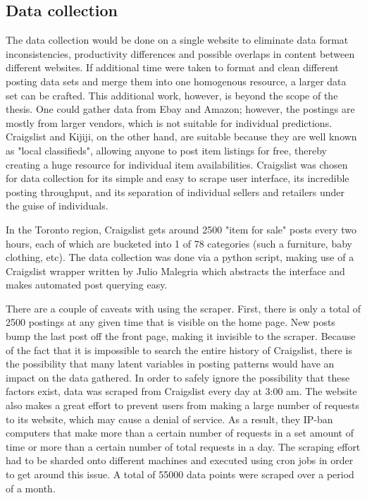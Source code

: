 \documentclass[12pt]{article}
\begin{document}
\subsection{Data collection}
The data collection would be done on a single website to eliminate data format inconsistencies, productivity differences and possible overlaps in content between different websites. If additional time were taken to format and clean different posting data sets and merge them into one homogenous resource, a larger data set can be crafted. This additional work, however, is beyond the scope of the thesis. One could gather data from Ebay and Amazon; however, the postings are mostly from larger vendors, which is not suitable for individual predictions. Craigslist and Kijiji, on the other hand, are suitable because they are well known as "local classifieds", allowing anyone to post item listings for free, thereby creating a huge resource for individual item availabilities. Craigslist was chosen for data collection for its simple and easy to scrape user interface, its incredible posting throughput, and its separation of individual sellers and retailers under the guise of individuals.

In the Toronto region, Craigslist gets around 2500 "item for sale" posts every two hours, each of which are bucketed into 1 of 78 categories (such a furniture, baby clothing, etc). The data collection was done via a python script, making use of a Craigslist wrapper written by Julio Malegria \cite{clwrapper} which abstracts the interface and makes automated post querying easy. 

There are a couple of caveats with using the scraper. First, there is only a total of 2500 postings at any given time that is visible on the home page. New posts bump the last post off the front page, making it invisible to the scraper. Because of the fact that it is impossible to search the entire history of Craigslist, there is the possibility that many latent variables in posting patterns would have an impact on the data gathered. In order to safely ignore the possibility that these factors exist, data was scraped from Craigslist every day at 3:00 am. The website also makes a great effort to prevent users from making a large number of requests to its website, which may cause a denial of service. As a result, they IP-ban computers that make more than a certain number of requests in a set amount of time or more than a certain number of total requests in a day. The scraping effort had to be sharded onto different machines and executed using cron jobs in order to get around this issue. A total of 55000 data points were scraped over a period of a month. 
\end{document}
